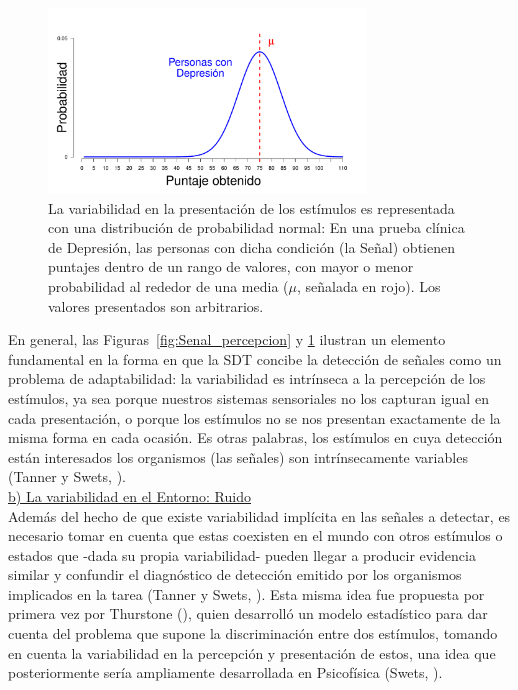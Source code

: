 \begin{figure}[h]
\centering
\includegraphics[width=0.75\textwidth]{Figures/Signal_Presentation} 
\decoRule
\caption[Variabilidad en la presentación de los estímulos]{La variabilidad en la presentación de los estímulos es representada con una distribución de probabilidad normal: En una prueba clínica de Depresión, las personas con dicha condición (la Señal) obtienen puntajes dentro de un rango de valores, con mayor o menor probabilidad al rededor de una media ($\mu$, señalada en rojo). Los valores presentados son arbitrarios.}
\label{fig:Senal_presentacion}
\end{figure}

En general, las Figuras~\ref{fig:Senal_percepcion} y \ref{fig:Senal_presentacion} ilustran un elemento fundamental en la forma en que la SDT concibe la detección de señales como un problema de adaptabilidad: la variabilidad es intrínseca a la percepción de los estímulos, ya sea porque nuestros sistemas sensoriales no los capturan igual en cada presentación, o porque los estímulos no se nos presentan exactamente de la misma forma en cada ocasión. Es otras palabras, los estímulos en cuya detección están interesados los organismos (las señales) son intrínsecamente variables (Tanner y Swets, \citeyear{Tanner1954}).\\

    \underline{b) La variabilidad en el Entorno: Ruido}\\

Además del hecho de que existe variabilidad implícita en las señales a detectar, es necesario tomar en cuenta que estas coexisten en el mundo con otros estímulos o estados que -dada su propia variabilidad- pueden llegar a producir evidencia similar y confundir el diagnóstico de detección emitido por los organismos implicados en la tarea (Tanner y Swets, \citeyear{Tanner1954}). Esta misma idea fue propuesta por primera vez por Thurstone (\citeyear{Thurstone1927}), quien desarrolló un modelo estadístico para dar cuenta del problema que supone la discriminación entre dos estímulos, tomando en cuenta la variabilidad en la percepción y presentación de estos, una idea que posteriormente sería ampliamente desarrollada en Psicofísica (Swets, \citeyear{Swets1973}).\\

